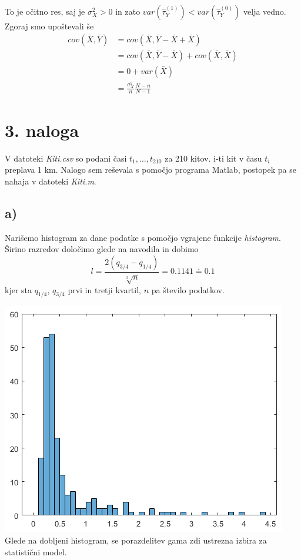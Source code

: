 \documentclass[A4paper, 11pt]{article}
\begin{document}
To je očitno res, saj je $\sigma_X^2 > 0$ in zato $var(\hat{\tau}_Y ^ {(1)}) < var(\hat{\tau}_Y ^ {(0)}) $ velja vedno.
Zgoraj smo upoštevali še
\[
\begin{split}
cov(\bar{X}, \bar{Y}) & = cov(\bar{X}, \bar{Y} - \bar{X} + \bar{X}) \\
                                   & = cov(\bar{X}, \bar{Y} - \bar{X}) + cov(\bar{X}, \bar{X}) \\
                                   & = 0 + var(\bar{X}) \\
                                   & = \frac{\sigma_X^2}{n} \frac{N - n}{N - 1}
\end{split}
\]



\section*{3. naloga}

V datoteki \textit{Kiti.csv} so podani časi $t_1, \ldots, t_{210}$ za 210 kitov. i-ti kit v času $t_i$ preplava 1 km. Nalogo sem reševala s pomočjo programa Matlab, postopek pa se nahaja v datoteki \textit{Kiti.m}.


\subsection*{a)}
Narišemo histogram za dane podatke s pomočjo vgrajene funkcije \textit{histogram}. Širino razredov določimo glede na navodila in dobimo 
\[ l = \frac{2(q_{3/4} - q_{1/4})}{\sqrt[3]{n}} = 0.1141 \doteq 0.1 \]
kjer sta $q_{1/4}$, $q_{3/4}$ prvi in tretji kvartil, $n$ pa število podatkov.

\includegraphics[scale=0.8]{Kiti_1}
\\
Glede na dobljeni histogram, se porazdelitev gama zdi ustrezna izbira za statistični model.
\end{document}
